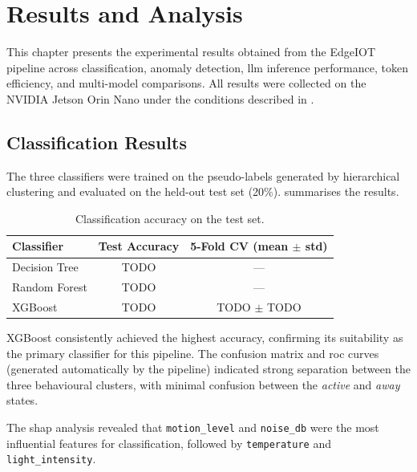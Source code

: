 \documentclass[12pt,a4paper,oneside]{report}
\begin{document}
\chapter{Results and Analysis}
\label{ch:results}

This chapter presents the experimental results obtained from the EdgeIOT pipeline across classification, anomaly detection, \gls{llm} inference performance, token efficiency, and multi-model comparisons. All results were collected on the NVIDIA Jetson Orin Nano under the conditions described in .


\section{Classification Results}
\label{sec:res-classification}

The three classifiers were trained on the pseudo-labels generated by hierarchical clustering and evaluated on the held-out test set (20\%).  summarises the results.

\begin{table}[htbp]
\caption{Classification accuracy on the test set.}
\label{tab:classification-results}
\centering
\begin{tabular}{lcc}
\toprule
\textbf{Classifier} & \textbf{Test Accuracy} & \textbf{5-Fold CV (mean $\pm$ std)} \\
\midrule
Decision Tree   & TODO & --- \\
Random Forest   & TODO & --- \\
XGBoost         & TODO & TODO $\pm$ TODO \\
\bottomrule
\end{tabular}
\end{table}


XGBoost consistently achieved the highest accuracy, confirming its suitability as the primary classifier for this pipeline. The confusion matrix and \gls{roc} curves (generated automatically by the pipeline) indicated strong separation between the three behavioural clusters, with minimal confusion between the \textit{active} and \textit{away} states.

The \gls{shap} analysis revealed that \texttt{motion\_level} and \texttt{noise\_db} were the most influential features for classification, followed by \texttt{temperature} and \texttt{light\_intensity}.
\end{document}
